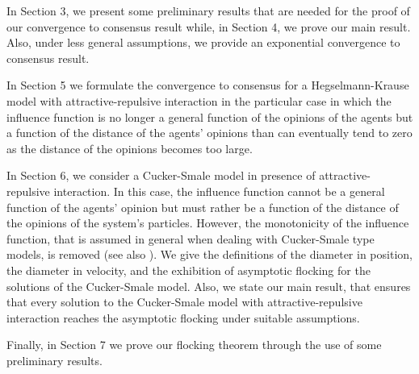 \documentclass[a4paper,11pt,oneside]{article}
\begin{document}
In Section 3, we present some preliminary results that are needed for the proof of our convergence to consensus result while,  in Section 4, we prove our main result. Also, under less general assumptions, we provide an exponential convergence to consensus result. 

In Section 5 we formulate the convergence to consensus for a Hegselmann-Krause model with attractive-repulsive interaction in the particular case in which the influence function is no longer a general function of the opinions of the agents but a function of the distance of the agents' opinions than can eventually tend to zero as the distance of the opinions becomes too large. 

In Section 6, we consider a Cucker-Smale model in presence of attractive-repulsive interaction. In this case, the influence function cannot be a general function of the 
agents' opinion but must rather be a function of the distance of the opinions of the system's particles. However, the monotonicity of the influence function, that is assumed in general when dealing with Cucker-Smale type models, is removed (see also \cite{Cont}). We give the definitions of the diameter in position, the diameter in velocity, and the exhibition of asymptotic flocking for the solutions of the Cucker-Smale model. Also, we state our main result, that ensures that every solution to the Cucker-Smale model with attractive-repulsive interaction reaches the asymptotic flocking under suitable assumptions.

Finally, in Section 7 we prove our flocking theorem through the use of some preliminary results.
\end{document}
